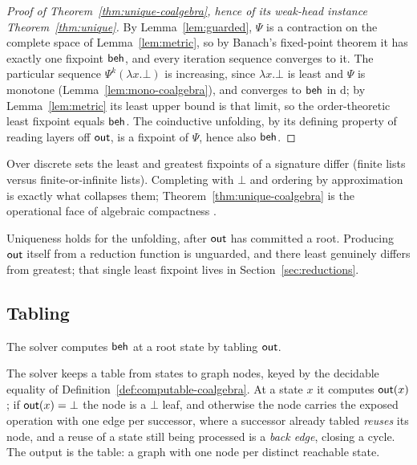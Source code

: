 \begin{proof}[Proof of Theorem~\ref{thm:unique-coalgebra}, hence of its weak-head instance Theorem~\ref{thm:unique}]
  By Lemma~\ref{lem:guarded}, $\Psi$ is a contraction on the complete space of Lemma~\ref{lem:metric}, so by Banach's fixed-point theorem \cite{banach1922-operations} it has exactly one fixpoint $\mathsf{beh}$, and every iteration sequence converges to it. The particular sequence $\Psi^k(\lambda x.\bot)$ is increasing, since $\lambda x.\bot$ is least and $\Psi$ is monotone (Lemma~\ref{lem:mono-coalgebra}), and converges to $\mathsf{beh}$ in $\mathrm{d}$; by Lemma~\ref{lem:metric} its least upper bound is that limit, so the order-theoretic least fixpoint equals $\mathsf{beh}$. The coinductive unfolding, by its defining property of reading layers off $\mathsf{out}$, is a fixpoint of $\Psi$, hence also $\mathsf{beh}$.
\end{proof}

\begin{remark}\label{rem:compact}
  Over discrete sets the least and greatest fixpoints of a signature differ (finite lists versus finite-or-infinite lists). Completing with $\bot$ and ordering by approximation is exactly what collapses them; Theorem~\ref{thm:unique-coalgebra} is the operational face of algebraic compactness \cite{smyth1982-recursive-domain-equations, freyd1991-algebraically-complete-categories}.
\end{remark}

\begin{remark}\label{rem:leastessential}
  Uniqueness holds for the unfolding, after $\mathsf{out}$ has committed a root. Producing $\mathsf{out}$
  itself from a reduction function is unguarded, and there least genuinely differs from greatest; that single least fixpoint lives in Section~\ref{sec:reductions}.
\end{remark}

\subsection{Tabling}\label{sec:tabling}

The solver computes $\mathsf{beh}$ at a root state by tabling $\mathsf{out}$.

\begin{definition}\label{def:solver}
  The solver keeps a table from states to graph nodes, keyed by the decidable equality of Definition~\ref{def:computable-coalgebra}. At a state $x$ it computes $\mathsf{out}(x)$;
  if $\mathsf{out}(x) = \bot$ the node is a $\bot$ leaf, and otherwise the node carries the exposed operation with one edge per successor, where a successor already tabled \emph{reuses} its node, and a reuse of a state still being processed is a \emph{back edge}, closing a cycle.
  The output is the table: a graph with one node per distinct reachable state.
\end{definition}

